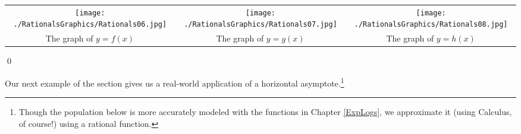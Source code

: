 \begin{ex}
\begin{enumerate}
\begin{center}
\begin{tabular}{ccc}

\texttt{[image: ./RationalsGraphics/Rationals06.jpg]}  & \texttt{[image: ./RationalsGraphics/Rationals07.jpg]} & \texttt{[image: ./RationalsGraphics/Rationals08.jpg]} \\

The graph of $y=f(x)$  & The graph of $y=g(x)$ & The graph of $y=h(x)$ \\


\end{tabular}
\end{center} 

\end{enumerate}

\vspace{-.25in} \qed

\end{ex}

Our next example of the section gives us a real-world application of a horizontal asymptote.\footnote{Though the population below is more accurately modeled with the functions in Chapter \ref{ExpLogs}, we approximate it (using Calculus, of course!) using a rational function.}

